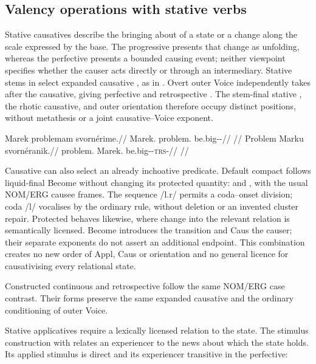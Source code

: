\subsection{Valency operations with stative verbs}\label{sec:stative-valency}

Stative causatives describe the bringing about of a state or a change along
the scale expressed by the base. The progressive presents that change as
unfolding, whereas the perfective presents a bounded causing event; neither
viewpoint specifies whether the causer acts directly or through an intermediary.
Stative stems in  select expanded causative , as in
. Overt outer Voice independently takes 
after the causative, giving perfective  and
retrospective . The stem-final stative ,
the rhotic causative, and outer orientation therefore occupy distinct
positions, without metathesis or a joint causative--Voice exponent.

\pex\label{ex:val-stative-caus}
\a
\begingl
\gla Marek problemam svornérime.//
\glb Marek.\Dir{} problem.\Ind{} be.big-\Caus{}-\Prog{}//
\glft {}//
\endgl
\a
\begingl
\gla Problem Marku svornéranik.//
\glb problem.\Dir{} Marek.\Trs{} be.big-\Caus{}-\textsc{trs}-\Pf{}//
\glft {}//
\endgl
\xe

Causative can also select an already inchoative predicate. Default compact
 follows liquid-final Become without changing its protected quantity:
  and
 , with the usual
NOM/ERG causee frames. The sequence /l.r/ permits a coda--onset division;
coda /l/ vocalises by the ordinary rule, without deletion or an invented
cluster repair. Protected  behaves likewise, where
change into the relevant relation is semantically licensed. Become introduces
the transition and Caus the causer; their separate exponents do not assert an
additional endpoint. This combination creates no new order of Appl, Caus or
orientation and no general licence for causativising every relational state.

Constructed continuous   and
retrospective   follow the same
NOM/ERG case contrast. Their forms preserve the same expanded causative and the ordinary
conditioning of outer Voice.

Stative applicatives require a lexically licensed relation to the state.
The stimulus construction with   relates an
experiencer to the news about which the state holds. Its applied stimulus is
direct and its experiencer transitive in the perfective:

